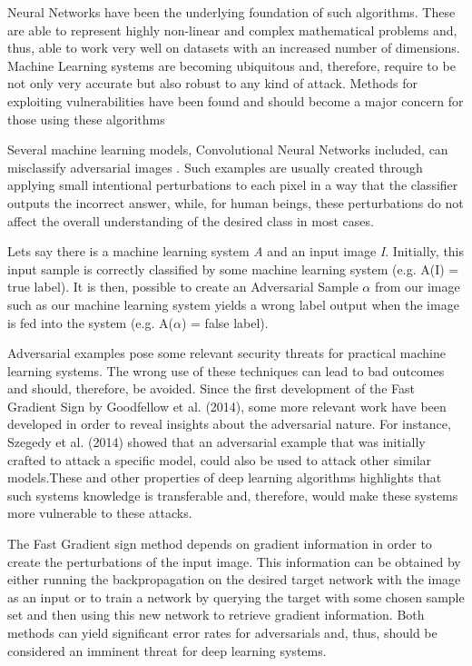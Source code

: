 \documentclass[10pt,journal,compsoc]{IEEEtran}
\begin{document}
Neural Networks have been the underlying foundation of such algorithms. These are able to represent highly non-linear and complex mathematical problems and, thus,  able to work very well on datasets with an increased number of dimensions. Machine Learning systems are becoming ubiquitous and, therefore, require to be not only very accurate but also robust to any kind of attack. Methods for exploiting vulnerabilities have been found and should become a major concern for those using these algorithms

Several machine learning models, Convolutional Neural Networks included, can misclassify adversarial images \cite{goodfellow2014}\cite{papernot2016transf}\cite{goodfellow2016}\cite{szegedy2013}. Such examples are usually created through applying small intentional perturbations to each pixel in a way that the classifier outputs the incorrect answer, while, for human beings, these perturbations do not affect the overall understanding of the desired class in most cases.

Lets say there is a machine learning system \textit{A} and an input image \textit{I}. Initially, this input sample is correctly classified by some machine learning system (e.g. A(I) = true label). It is then, possible to create an Adversarial Sample $\alpha$ from our image such as our machine learning system yields a wrong label output when the image is fed into the system (e.g. A($\alpha$) = false label).

Adversarial examples pose some relevant security threats for practical machine learning systems. The wrong use of these techniques can lead to bad outcomes and should, therefore, be avoided. Since the first development of the Fast Gradient Sign by Goodfellow et al. (2014), some more relevant work have been developed in order to reveal insights about the adversarial nature. For instance, Szegedy et al. (2014) showed that an adversarial example that was initially crafted to attack a specific model, could also be used to attack other similar models.These and other properties of deep learning algorithms highlights that such systems knowledge is transferable and, therefore, would make these systems more vulnerable to these attacks.

The Fast Gradient sign method depends on gradient information in order to create the perturbations of the input image. This information can be obtained by either running the backpropagation on the desired target network with the image as an input or to train a network by querying the target with some chosen sample set and then using this new network to retrieve gradient information. Both methods can yield significant error rates \cite{goodfellow2014}\cite{papernot2016transf} for adversarials and, thus, should be considered an imminent threat for deep learning systems.
\end{document}
